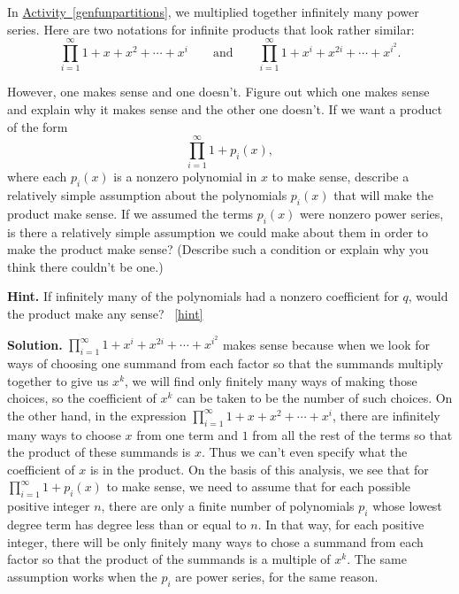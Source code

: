 \documentclass{book}
\begin{document}
\setcounter{project}{320}
\addtocounter{project}{-1}
\begin{activity}[]\label{activity-313}
\hypertarget{p-1607}{}%
In \hyperref[genfunpartitions]{Activity~\ref{genfunpartitions}}, we multiplied together infinitely many power series. Here are two notations for infinite products that look rather similar:%
\begin{equation*}
\prod_{i=1}^\infty 1 + x + x^2 +\cdots+ x^i\qquad\mbox{and}\qquad
\prod_{i=1}^\infty 1 +x^i +x^{2i} +\cdots + x^{i^2}.
\end{equation*}
%
\par
\hypertarget{p-1608}{}%
However, one makes sense and one doesn't. Figure out which one makes sense and explain why it makes sense and the other one doesn't. If we want a product of the form%
\begin{equation*}
\prod_{i=1}^\infty 1 +p_i(x),
\end{equation*}
where each \(p_i(x)\) is a nonzero polynomial in \(x\) to make sense, describe a relatively simple assumption about the polynomials \(p_i(x)\) that will make the product make sense. If we assumed the terms \(p_i(x)\) were nonzero power series, is there a relatively simple assumption we could make about them in order to make the product make sense? (Describe such a condition or explain why you think there couldn't be one.)%
\par\smallskip%
\noindent\textbf{Hint.}\hypertarget{hint-211}{}\quad%
\hypertarget{p-1609}{}%
If infinitely many of the polynomials had a nonzero coefficient for \(q\), would the product make any sense?%
~\hfill{\tiny\hyperlink{a-320}{[hint]}\hypertarget{q-320}{}}\par\smallskip%
\noindent\textbf{Solution.}\hypertarget{solution-218}{}\quad%
\hypertarget{p-1610}{}%
\(\prod_{i=1}^\infty 1 +x^i +x^{2i} +\cdots + x^{i^2}\) makes sense because when we look for ways of choosing one summand from each factor so that the summands multiply together to give us \(x^k\), we will find only finitely many ways of making those choices, so the coefficient of \(x^k\) can be taken to be the number of such choices. On the other hand, in the expression \(\prod_{i=1}^\infty 1 + x + x^2 +\cdots+ x^i\), there are infinitely many ways to choose \(x\) from one term and \(1\) from all the rest of the terms so that the product of these summands is \(x\). Thus we can't even specify what the coefficient of \(x\) is in the product. On the basis of this analysis, we see that for \(\prod_{i=1}^\infty 1 +p_i(x)\) to make sense, we need to assume that for each possible positive integer \(n\), there are only a finite number of polynomials \(p_i\) whose lowest degree term has degree less than or equal to \(n\). In that way, for each positive integer, there will be only finitely many ways to chose a summand from each factor so that the product of the summands is a multiple of \(x^k\). The same assumption works when the \(p_i\) are power series, for the same reason.%
\end{activity}

\clearpage
\end{document}
